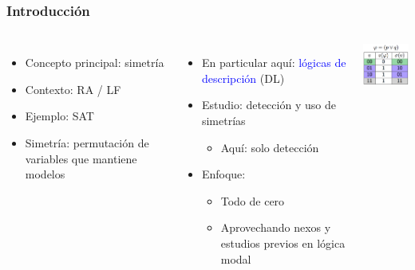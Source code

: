 \documentclass[compress,xcolor=dvipsnames]{beamer}
\theoremstyle{definition}
\begin{document}
\begin{frame}
	\frametitle{Introducción}
  \begin{block}{}
    \begin{columns}[onlytextwidth,T]
      \column{\dimexpr\linewidth-20mm-2mm}
		\begin{itemize}
			\item Concepto principal: simetría
			\item Contexto: RA / LF
			\item Ejemplo: SAT
			\item Simetría: permutación de variables que mantiene modelos
		\end{itemize}
		\begin{itemize}[<+->]
					\item En particular aquí: \textcolor{blue}{lógicas de descripción} (DL)
			\item Estudio: detección y uso de simetrías
			\begin{itemize}[<.->]
				\item Aquí: solo detección
			\end{itemize}
			\item Enfoque:
				\begin{itemize}[<+->]
					\item Todo de cero
					\item \alert<+->{Aprovechando nexos y estudios previos en lógica modal}
				\end{itemize}
		\end{itemize}
      	\column{30mm}
      	\includegraphics[width=30mm]{gfx/sym_ex}
    \end{columns}
  \end{block}
\end{frame}
\end{document}
